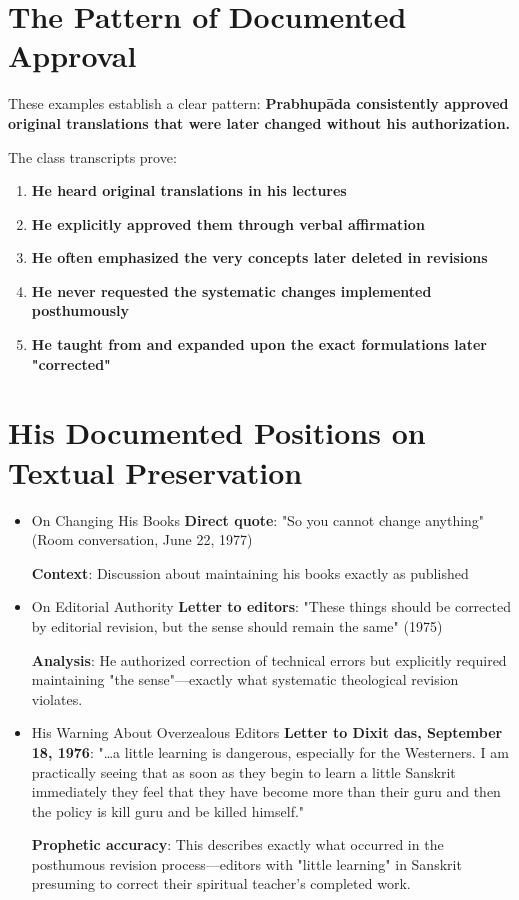 \documentclass[11pt,twoside]{book}
\begin{document}
\section*{The Pattern of Documented Approval}
\label{sec:org80435b8}

These examples establish a clear pattern: \textbf{\textbf{Prabhupāda consistently approved original translations that were later changed without his authorization.}}

The class transcripts prove:
\begin{enumerate}
\item \textbf{\textbf{He heard original translations in his lectures}}
\item \textbf{\textbf{He explicitly approved them through verbal affirmation}}
\item \textbf{\textbf{He often emphasized the very concepts later deleted in revisions}}
\item \textbf{\textbf{He never requested the systematic changes implemented posthumously}}
\item \textbf{\textbf{He taught from and expanded upon the exact formulations later "corrected"}}
\end{enumerate}
\section*{His Documented Positions on Textual Preservation}
\label{sec:org66710de}

\begin{itemize}
\item On Changing His Books
\label{sec:org583ac92}
\textbf{\textbf{Direct quote}}: "So you cannot change anything" (Room conversation, June 22, 1977)

\textbf{\textbf{Context}}: Discussion about maintaining his books exactly as published
\item On Editorial Authority
\label{sec:orgc5ce218}
\textbf{\textbf{Letter to editors}}: "These things should be corrected by editorial revision, but the sense should remain the same" (1975)

\textbf{\textbf{Analysis}}: He authorized correction of technical errors but explicitly required maintaining "the sense"—exactly what systematic theological revision violates.
\item His Warning About Overzealous Editors
\label{sec:orgcc60c9e}
\textbf{\textbf{Letter to Dixit das, September 18, 1976}}: "\ldots{}a little learning is dangerous, especially for the Westerners. I am practically seeing that as soon as they begin to learn a little Sanskrit immediately they feel that they have become more than their guru and then the policy is kill guru and be killed himself."

\textbf{\textbf{Prophetic accuracy}}: This describes exactly what occurred in the posthumous revision process—editors with "little learning" in Sanskrit presuming to correct their spiritual teacher's completed work.
\end{itemize}
\end{document}
